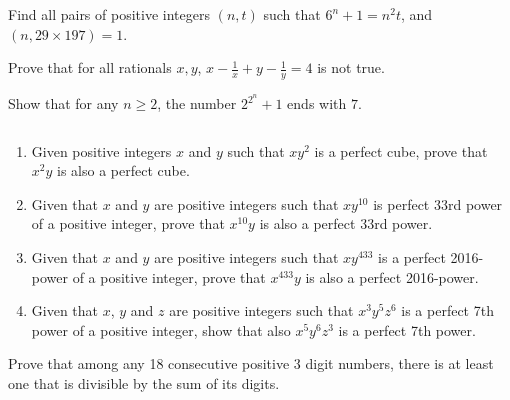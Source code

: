 \begin{problem}
	Find all pairs of positive integers $(n,t)$ such that $6^n+1=n^2t$, and $(n,29 \times 197)=1$. %
\end{problem}

\begin{problem}
	Prove that for all rationals $x,y$, $x-\frac{1}{x}+y-\frac{1}{y}=4$ is not true. %
\end{problem}

\begin{problem}
	Show that for any $n\geq 2$, the number $2^{2^n}+1$ ends with $7$. %
\end{problem}

\begin{problem}
	$ $
	\begin{enumerate}
		\item Given positive integers $x$ and $y$ such that $xy^2$ is a perfect cube, prove that $x^2y$ is also a perfect cube. %
		\item Given that $x$ and $y$ are positive integers such that $xy^{10}$ is perfect 33rd power of a positive integer, prove that $x^{10}y$ is also a perfect 33rd power. %
		\item Given that $x$ and $y$ are positive integers such that $xy^{433}$ is a perfect 2016-power of a positive integer, prove that $x^{433}y$ is also a perfect 2016-power. %
		\item Given that $x$, $y$ and $z$ are positive integers such that $x^3y^5z^6$ is a perfect 7th power of a positive integer, show that also $x^5y^6z^3$ is a perfect 7th power. %
	\end{enumerate}
\end{problem}

\begin{problem}
	Prove that among any 18 consecutive positive $3$ digit numbers, there is at least one that is divisible by the sum of its digits. %
\end{problem}

